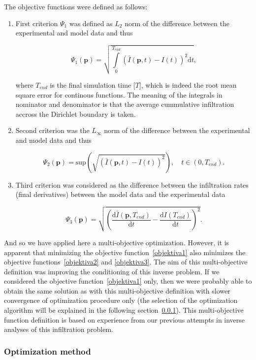\documentclass[review]{elsarticle}
\newenvironment{lineq}
    {\begin{linenomath*}
    \begin{equation}
    }
    { 
    \end{equation} 
    \end{linenomath*}
    }
\newcommand{\dd}{\mathrm{d}}
\renewcommand{\vec}{\mathbf}
\begin{document}
The objective functions were defined as follows:
\begin{enumerate}[label={\bf \Roman*}.]
\item First criterion $\Psi_1$ was defined as $L_2$ norm of the difference between the  experimental and model data and thus
\begin{lineq}
\label{objektiva1}
\Psi_1 (\vec{p}) = \sqrt{\int\limits_0^{T_{end}} \left( \bar{I}(\vec{p},t) - I(t) \right)^2 \dd t},
\end{lineq}
where $T_{end}$ is the final simulation time [$T$], which is indeed the root mean square error for continous functions. The meaning of the integrals in nominator and denominator is that the average cummulative infiltration accross the Dirichlet boundary is taken.
\item Second criterion was the $L_{\infty}$ norm of the difference between the experimental and model data and thus
\begin{lineq}
\label{objektiva2}
\Psi_2 (\vec{p}) = \mathrm{sup} \left( \sqrt{\left( \bar{I}(\vec{p},t) - I(t) \right)^2} \right), \quad  t \in (0, T_{end}).
\end{lineq}
\item Third criterion was considered as the difference between the infiltration rates (final derivatives) between the model data and the experimental data
\begin{lineq}
\label{objektiva3}
\Psi_3 (\vec{p}) =  \sqrt{\left( \frac{\dd \bar{I}(\vec{p},T_{end})}{\dd t} - \frac{\dd I(T_{end})}{\dd t} \right)^2}.
\end{lineq}


\end{enumerate}
And so we have applied here a multi-objective optimization. However, it is apparent that minimizing the objective function~\eqref{objektiva1} also minimizes the objective functions~\eqref{objektiva2} and  \eqref{objektiva3}. The aim of this multi-objective definition was improving the conditioning of this inverse problem. If we considered the objective function~\eqref{objektiva1} only, then we were probably able to obtain the same solution as with this multi-objective definition with slower convergence of optimization procedure only (the selection of the optimization algorithm will be explained in the following section~\ref{optima}). This multi-objective function definition is based on experience from our previous attempts in inverse analyses of this infiltration problem.



\subsubsection{Optimization method}%
\label{optima}
\end{document}
